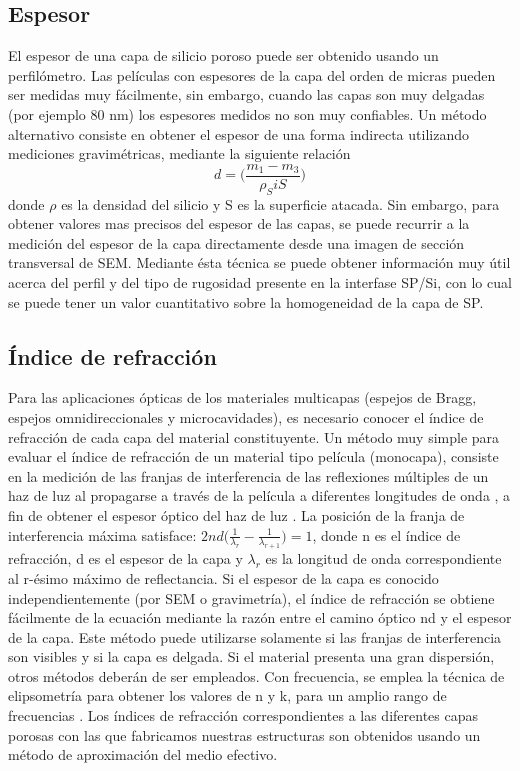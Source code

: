 \documentclass[a4paper,11pt,]{book}
\begin{document}
\subsection{Espesor}
El espesor de una capa de silicio poroso puede ser obtenido usando un perfilómetro. Las películas con espesores de la capa del orden de micras pueden ser medidas muy fácilmente, sin embargo, cuando las capas son muy delgadas (por ejemplo 80 nm) los espesores medidos no son muy confiables. Un método alternativo consiste en obtener el espesor de una forma indirecta utilizando mediciones gravimétricas, mediante la siguiente relación 
\begin{equation}
d= \bigg(\frac{m_1-m_3}{\rho_Si S}\bigg)
\end{equation}
donde $\rho$ es la densidad del silicio y S es la superficie atacada. Sin embargo, para obtener valores mas precisos del espesor de las capas, se puede recurrir a la medición del espesor de la capa directamente desde una imagen de sección transversal de SEM. Mediante ésta técnica se puede obtener información muy útil acerca del perfil y del tipo de rugosidad presente en la interfase SP/Si, con lo cual se puede tener un valor
cuantitativo sobre la homogeneidad de la capa de SP.
\subsection{Índice de refracción}
Para las aplicaciones ópticas de los materiales multicapas (espejos de Bragg, espejos omnidireccionales y microcavidades), es necesario conocer el índice de refracción de cada capa del material constituyente. Un método muy simple para evaluar el índice de refracción de un material tipo película (monocapa), consiste en la medición de las franjas de interferencia de las reflexiones múltiples de un haz de luz al propagarse a través de la película a diferentes longitudes de onda , a fin de obtener el espesor óptico del haz de luz . La posición de la franja de interferencia máxima satisface: $2nd \bigg(\frac{1}{\lambda_r}-\frac{1}{\lambda_{r+1}} \bigg)=1$, donde n es el índice de refracción, d es el espesor de la capa y $\lambda_r$ es la longitud de onda correspondiente al r-ésimo máximo de reflectancia. Si el espesor de la capa es conocido independientemente (por SEM o gravimetría), el índice de refracción se obtiene fácilmente de la ecuación mediante la razón entre el camino óptico nd y el espesor de la capa. Este método puede utilizarse solamente si las franjas de interferencia son visibles y si la capa es delgada. Si el material presenta una gran dispersión, otros métodos deberán de ser empleados. Con frecuencia, se emplea la técnica de elipsometría para obtener los valores de n y k, para un amplio rango de frecuencias . Los índices de refracción correspondientes a las diferentes capas porosas con las que fabricamos nuestras estructuras son obtenidos usando un método de aproximación del medio efectivo.
\end{document}
